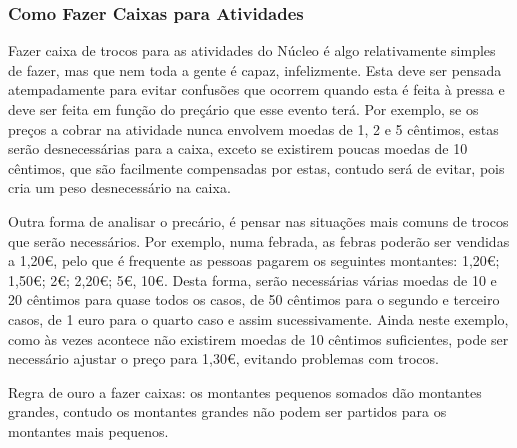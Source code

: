 
\subsubsection{Como Fazer Caixas para Atividades}

Fazer caixa de trocos para as atividades do Núcleo é algo relativamente simples de fazer, mas que nem toda a gente é capaz, infelizmente. Esta deve ser pensada atempadamente para evitar confusões que ocorrem quando esta é feita à pressa e deve ser feita em função do preçário que esse evento terá. Por exemplo, se os preços a cobrar na atividade nunca envolvem moedas de 1, 2 e 5 cêntimos, estas serão desnecessárias para a caixa, exceto se existirem poucas moedas de 10 cêntimos, que são facilmente compensadas por estas, contudo será de evitar, pois cria um peso desnecessário na caixa.

Outra forma de analisar o precário, é pensar nas situações mais comuns de trocos que serão necessários. Por exemplo, numa febrada, as febras poderão ser vendidas a 1,20€, pelo que é frequente as pessoas pagarem os seguintes montantes: 1,20€; 1,50€; 2€; 2,20€; 5€, 10€. Desta forma, serão necessárias várias moedas de 10 e 20 cêntimos para quase todos os casos, de 50 cêntimos para o segundo e terceiro casos, de 1 euro para o quarto caso e assim sucessivamente. Ainda neste exemplo, como às vezes acontece não existirem moedas de 10 cêntimos suficientes, pode ser necessário ajustar o preço para 1,30€, evitando problemas com trocos.

Regra de ouro a fazer caixas: os montantes pequenos somados dão montantes grandes, contudo os montantes grandes não podem ser partidos para os montantes mais pequenos.